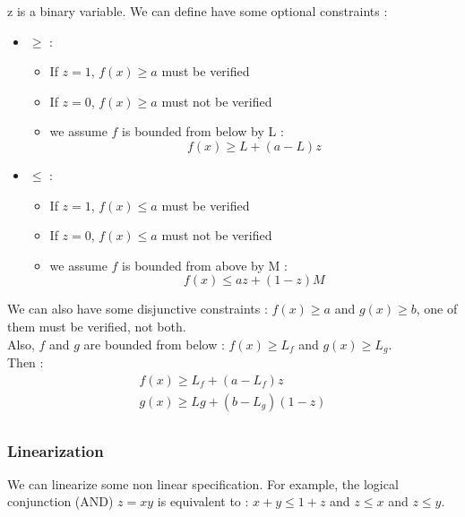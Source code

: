 \documentclass[../main.tex]{subfiles}
\begin{document}
z is a binary variable. We can define have some optional constraints : \begin{itemize}
    \item $\geq$ : \begin{itemize}
        \item If $z=1$, $f(x)\geq a$ must be verified\\
        \item If $z=0$, $f(x)\geq a$ must not be verified\\
        \item we assume $f$ is bounded from below by L : \begin{equation}
            f(x) \geq L+(a-L)z
        \end{equation}
    \end{itemize}
    \item $\leq$ : \begin{itemize}
        \item If $z=1$, $f(x)\leq a$ must be verified\\
        \item If $z=0$, $f(x)\leq a$ must not be verified\\
        \item we assume $f$ is bounded from above by M : \begin{equation}
            f(x) \leq az + (1-z)M
        \end{equation}
    \end{itemize}
\end{itemize}

We can also have some disjunctive constraints : $f(x)\geq a$ and $g(x) \geq b$, one of them must be verified, not both.\\
Also, $f$ and $g$ are bounded from below : $f(x)\geq L_f$ and $g(x)\geq L_g$.\\

Then : \begin{equation}
    \begin{gathered}
        f(x)\geq L_f + (a-L_f)z\\
        g(x) \geq Lg + (b-L_g)(1-z)\\
    \end{gathered}
\end{equation}

\subsubsection{Linearization}
We can linearize some non linear specification. For example, the logical conjunction (AND) $z=xy$ is equivalent to : $x+y\leq 1+ z$ and $z\leq x$ and $z\leq y$.\\
\end{document}

